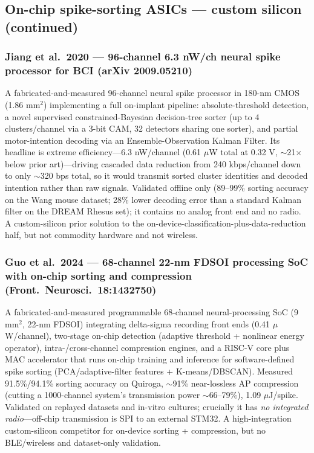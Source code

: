 \documentclass[11pt]{article}
\begin{document}
\subsection*{On-chip spike-sorting ASICs --- custom silicon (continued)}

\subsubsection*{Jiang et al.\ 2020 --- 96-channel 6.3 nW/ch neural spike processor for BCI (arXiv 2009.05210)}
A fabricated-and-measured 96-channel neural spike processor in 180-nm CMOS (1.86 mm$^2$) implementing a full on-implant pipeline: absolute-threshold detection, a novel supervised constrained-Bayesian decision-tree sorter (up to 4 clusters/channel via a 3-bit CAM, 32 detectors sharing one sorter), and partial motor-intention decoding via an Ensemble-Observation Kalman Filter. Its headline is extreme efficiency---6.3 nW/channel (0.61 $\mu$W total at 0.32 V, $\sim$21$\times$ below prior art)---driving cascaded data reduction from 240 kbps/channel down to only $\sim$320 bps total, so it would transmit sorted cluster identities and decoded intention rather than raw signals. Validated offline only (89--99\% sorting accuracy on the Wang mouse dataset; 28\% lower decoding error than a standard Kalman filter on the DREAM Rhesus set); it contains no analog front end and no radio. A custom-silicon prior solution to the on-device-classification-plus-data-reduction half, but not commodity hardware and not wireless.

\subsubsection*{Guo et al.\ 2024 --- 68-channel 22-nm FDSOI processing SoC with on-chip sorting and compression (Front.\ Neurosci.\ 18:1432750)}
A fabricated-and-measured programmable 68-channel neural-processing SoC (9 mm$^2$, 22-nm FDSOI) integrating delta-sigma recording front ends (0.41 $\mu$W/channel), two-stage on-chip detection (adaptive threshold + nonlinear energy operator), intra-/cross-channel compression engines, and a RISC-V core plus MAC accelerator that runs on-chip training and inference for software-defined spike sorting (PCA/adaptive-filter features + K-means/DBSCAN). Measured 91.5\%/94.1\% sorting accuracy on Quiroga, $\sim$91\% near-lossless AP compression (cutting a 1000-channel system's transmission power $\sim$66--79\%), 1.09 $\mu$J/spike. Validated on replayed datasets and in-vitro cultures; crucially it has \emph{no integrated radio}---off-chip transmission is SPI to an external STM32. A high-integration custom-silicon competitor for on-device sorting + compression, but no BLE/wireless and dataset-only validation.
\end{document}
